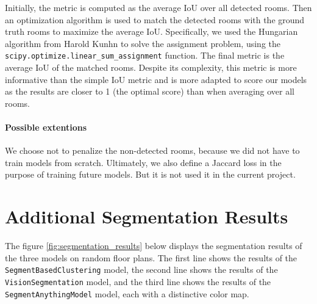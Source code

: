 \documentclass[11pt]{article}
\begin{document}
Initially, the metric is computed as the average IoU over all detected rooms.
Then an optimization algorithm is used to match the detected rooms with the ground truth rooms
to maximize the average IoU. Specifically, we used the Hungarian algorithm from 
Harold Kunhn to solve the
assignment problem, using the \texttt{scipy.optimize.linear\_sum\_assignment} function.
The final metric is the average IoU of the matched rooms.
Despite its complexity, this metric is more informative than the simple IoU metric 
and is more adapted to score our models as the results are closer to 1 (the 
optimal score) than when averaging over all rooms.

\paragraph{Possible extentions}
We choose not to penalize the non-detected rooms, because we 
did not have to train models from scratch. Ultimately, we also define a Jaccard 
loss in the purpose of training future models. But it is not used it in the current project.


\section{Additional Segmentation Results}

The figure \ref{fig:segmentation_results} below displays the segmentation results of the three models on random
floor plans. The first line shows the results of the \texttt{SegmentBasedClustering} model,
the second line shows the results of the \texttt{VisionSegmentation} model, and the third line
shows the results of the \texttt{SegmentAnythingModel} model, each with a 
distinctive color map.
\end{document}

